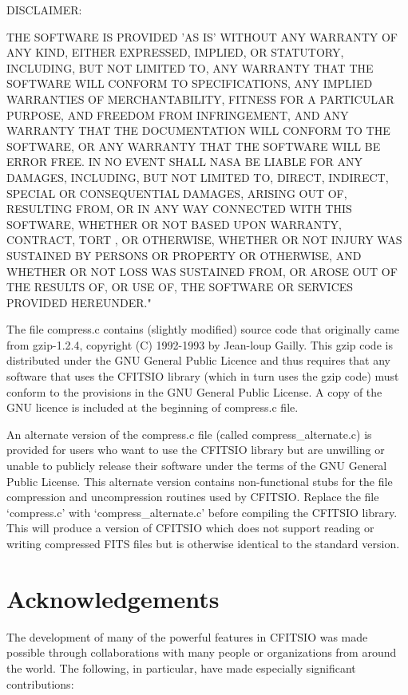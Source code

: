 \documentclass[11pt]{book}
\begin{document}
DISCLAIMER:

THE SOFTWARE IS PROVIDED 'AS IS' WITHOUT ANY WARRANTY OF ANY KIND,
EITHER EXPRESSED, IMPLIED, OR STATUTORY, INCLUDING, BUT NOT LIMITED TO,
ANY WARRANTY THAT THE SOFTWARE WILL CONFORM TO SPECIFICATIONS, ANY
IMPLIED WARRANTIES OF MERCHANTABILITY, FITNESS FOR A PARTICULAR
PURPOSE, AND FREEDOM FROM INFRINGEMENT, AND ANY WARRANTY THAT THE
DOCUMENTATION WILL CONFORM TO THE SOFTWARE, OR ANY WARRANTY THAT THE
SOFTWARE WILL BE ERROR FREE.  IN NO EVENT SHALL NASA BE LIABLE FOR ANY
DAMAGES, INCLUDING, BUT NOT LIMITED TO, DIRECT, INDIRECT, SPECIAL OR
CONSEQUENTIAL DAMAGES, ARISING OUT OF, RESULTING FROM, OR IN ANY WAY
CONNECTED WITH THIS SOFTWARE, WHETHER OR NOT BASED UPON WARRANTY,
CONTRACT, TORT , OR OTHERWISE, WHETHER OR NOT INJURY WAS SUSTAINED BY
PERSONS OR PROPERTY OR OTHERWISE, AND WHETHER OR NOT LOSS WAS SUSTAINED
FROM, OR AROSE OUT OF THE RESULTS OF, OR USE OF, THE SOFTWARE OR
SERVICES PROVIDED HEREUNDER."

The file compress.c contains (slightly modified) source code that
originally came from gzip-1.2.4, copyright (C) 1992-1993 by Jean-loup
Gailly.  This gzip code is distributed under the GNU General Public
Licence and thus requires that any software that uses the CFITSIO
library (which in turn uses the gzip code) must conform to the
provisions in the GNU General Public License.  A copy of the GNU
licence is included at the beginning of compress.c file.

An alternate version of the compress.c file (called
compress\_alternate.c) is provided for users who want to use the CFITSIO
library but are unwilling or unable to publicly release their software
under the terms of the GNU General Public License.   This alternate
version contains non-functional stubs for the file compression and
uncompression routines used by CFITSIO.  Replace the file `compress.c'
with `compress\_alternate.c' before compiling the CFITSIO library.  This
will produce a version of CFITSIO which does not support reading or
writing compressed FITS files but is otherwise identical to the
standard version.


\section{Acknowledgements}

The development of many of the powerful features in CFITSIO was made
possible through collaborations with many people or organizations from
around the world.  The following, in particular, have made especially
significant contributions:
\end{document}
